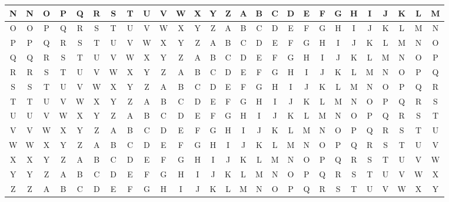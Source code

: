 \documentclass[12pt]{beamer}
\begin{document}
\begin{frame}
\begin{adjustbox}{max width=\textwidth}
\begin{tabular}{| c || c | c | c | c | c | c | c | c | c | c | c | c | c | c | c | c | c | c | c | c | c | c | c | c | c | c |}
			N & N & O & P & Q & R & S & T & U & V & W & X & Y & Z & A & B & C & D & E & F & G & H & I & J & K & L & M \\ \hline
			O & O & P & Q & R & S & T & U & V & W & X & Y & Z & A & B & C & D & E & F & G & H & I & J & K & L & M & N \\ \hline
			P & P & Q & R & S & T & U & V & W & X & Y & Z & A & B & C & D & E & F & G & H & I & J & K & L & M & N & O \\ \hline
			Q & Q & R & S & T & U & V & W & X & Y & Z & A & B & C & D & E & F & G & H & I & J & K & L & M & N & O & P \\ \hline
			R & R & S & T & U & V & W & X & Y & Z & A & B & C & D & E & F & G & H & I & J & K & L & M & N & O & P & Q \\ \hline
			S & S & T & U & V & W & X & Y & Z & A & B & C & D & E & F & G & H & I & J & K & L & M & N & O & P & Q & R \\ \hline
			T & T & U & V & W & X & Y & Z & A & B & C & D & E & F & G & H & I & J & K & L & M & N & O & P & Q & R & S \\ \hline
			U & U & V & W & X & Y & Z & A & B & C & D & E & F & G & H & I & J & K & L & M & N & O & P & Q & R & S & T \\ \hline
			V & V & W & X & Y & Z & A & B & C & D & E & F & G & H & I & J & K & L & M & N & O & P & Q & R & S & T & U \\ \hline
			W & W & X & Y & Z & A & B & C & D & E & F & G & H & I & J & K & L & M & N & O & P & Q & R & S & T & U & V \\ \hline
			X & X & Y & Z & A & B & C & D & E & F & G & H & I & J & K & L & M & N & O & P & Q & R & S & T & U & V & W \\ \hline
			Y & Y & Z & A & B & C & D & E & F & G & H & I & J & K & L & M & N & O & P & Q & R & S & T & U & V & W & X \\ \hline
			Z & Z & A & B & C & D & E & F & G & H & I & J & K & L & M & N & O & P & Q & R & S & T & U & V & W & X & Y \\ \hline
			
		\end{tabular}
	\end{adjustbox}
\end{frame}
\end{document}
